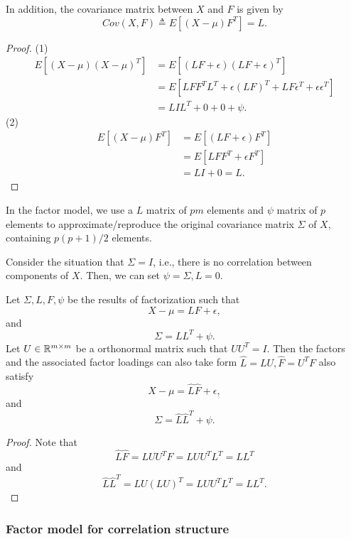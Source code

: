 \begin{refsection}
\begin{lemma}
In addition, the covariance matrix between $X$ and $F$ is given by
$$Cov(X,F) \triangleq E[(X - \mu)F^T] = L.$$
\end{lemma}
\begin{proof}
(1)	
\begin{align*}
E[(X-\mu)(X-\mu)^T] &= E[(LF + \epsilon)(LF + \epsilon)^T] \\
&=E[LFF^TL^T + \epsilon (LF)^T + LF\epsilon^T + \epsilon \epsilon^T] \\
&= LIL^T + 0 + 0 + \psi. 
\end{align*}	
(2)
\begin{align*}
E[(X-\mu)F^T] &= E[(LF + \epsilon)F^T] \\
&=E[LFF^T + \epsilon F^T] \\
&= LI + 0 = L. 
\end{align*}
\end{proof}


\begin{remark}
In the factor model, we use a $L$ matrix of $pm$ elements and $\psi$ matrix of $p$ elements to approximate/reproduce the original covariance matrix $\Sigma$ of $X$, containing $p(p+1)/2$ elements. 	
\end{remark}

\begin{remark}[$L = 0$ if there is no correlation between components of $X$]
Consider the situation that $\Sigma = I$, i.e., there is no correlation between components of $X$. Then, we can set $\psi = \Sigma, L = 0$.	
\end{remark}

\begin{lemma}\cite[573]{anderson2009introduction}\cite[488,504]{johnson2007applied}
Let $\Sigma, L,F, \psi$ be the results of factorization such that
$$X-\mu = LF + \epsilon,$$
and
$$\Sigma = LL^T + \psi. $$
Let $U \in \mathbb{R}^{m\times m}$ be a orthonormal matrix such that $UU^T = I$. Then the factors and the associated factor loadings can also take form 
$\hat{L} = LU, \hat{F} = U^TF$ also satisfy
$$X-\mu = \hat{L}\hat{F} + \epsilon,$$
and
 	$$\Sigma = \hat{L}\hat{L}^T + \psi. $$
\end{lemma}
\begin{proof}
Note that	
$$\hat{L}\hat{F} = LUU^TF = LUU^TL^T = LL^T$$
and
$$\hat{L}\hat{L}^T = LU(LU)^T = LUU^TL^T = LL^T.$$	
\end{proof}

\subsubsection{Factor model for correlation structure}


\end{refsection}
